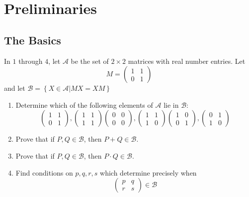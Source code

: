 \chapter{Preliminaries}
\section{The Basics}
In $1$ through $4$, let $\mathcal{A}$ be the set of $2\times2$ matrices with real number entries.  Let \[M = \left(
	\begin{array}{cc}
	1& 1 \\ 
	0& 1
	\end{array} 
\right)\]
and let $\mathcal{B} =\left\{X\in \mathcal{A}| MX = XM\right\}$
\begin{enumerate}
	\item Determine which of the following elements of $\mathcal{A}$ lie in $\mathcal{B}$:
		\[
		\left(
		\begin{array}{cc}
		1& 1 \\ 
		0& 1
		\end{array} 
		\right),
		\left(
		\begin{array}{cc}
		1& 1 \\ 
		1& 1
		\end{array} 
		\right)
		\left(
		\begin{array}{cc}
		0& 0 \\ 
		0& 0
		\end{array} 
		\right),
		\left(
		\begin{array}{cc}
		1& 1 \\ 
		1& 0
		\end{array} 
		\right)
		\left(
		\begin{array}{cc}
		1& 0 \\ 
		0& 1
		\end{array} 
		\right),
		\left(
		\begin{array}{cc}
		0& 1 \\ 
		1& 0
		\end{array} 
		\right)
		\]
	\item Prove that if $P,Q\in \mathcal{B}$, then $P+Q\in \mathcal{B}$.
	\item Prove that if $P,Q\in \mathcal{B}$, then $P\cdot Q\in \mathcal{B}$.
	\item Find conditions on $p,q,r,s$ which determine precisely when 
		\[	\left(
		\begin{array}{cc}
		p& q \\ 
		r& s
		\end{array} 
		\right)\in\mathcal{B}\]

\end{enumerate}

